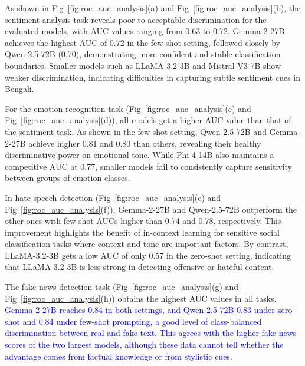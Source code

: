 \documentclass[10pt,letterpaper]{article}
\newcommand{\rev}[1]{\textcolor{blue}{#1}}
\begin{document}
As shown in Fig~\ref{fig:roc_auc_analysis}(a) and Fig~\ref{fig:roc_auc_analysis}(b), the sentiment analysis task reveals poor to acceptable discrimination for the evaluated models, with AUC values ranging from 0.63 to 0.72. Gemma-2-27B achieves the highest AUC of 0.72 in the few-shot setting, followed closely by Qwen-2.5-72B (0.70), demonstrating more confident and stable classification boundaries. Smaller models such as LLaMA-3.2-3B and Mistral-V3-7B show weaker discrimination, indicating difficulties in capturing subtle sentiment cues in Bengali.

For the emotion recognition task (Fig~\ref{fig:roc_auc_analysis}(c) and Fig~\ref{fig:roc_auc_analysis}(d)), all models get a higher AUC value than that of the sentiment task. As shown in the few-shot setting, Qwen-2.5-72B and Gemma-2-27B achieve higher 0.81 and 0.80 than others, revealing their healthy discriminative power on emotional tone. While Phi-4-14B also maintains a competitive AUC at 0.77, smaller models fail to consistently capture sensitivity between groups of emotion classes.

In hate speech detection (Fig~\ref{fig:roc_auc_analysis}(e) and Fig~\ref{fig:roc_auc_analysis}(f)), Gemma-2-27B and Qwen-2.5-72B outperform the other ones with few-shot AUCs higher than 0.74 and 0.78, respectively. This improvement highlights the benefit of in-context learning for sensitive social classification tasks where context and tone are important factors. By contrast, LLaMA-3.2-3B gets a low AUC of only 0.57 in the zero-shot setting, indicating that LLaMA-3.2-3B is less strong in detecting offensive or hateful content.

The fake news detection task (Fig~\ref{fig:roc_auc_analysis}(g) and Fig~\ref{fig:roc_auc_analysis}(h)) obtains the highest AUC values in all tasks. \rev{Gemma-2-27B reaches 0.84 in both settings, and Qwen-2.5-72B 0.83 under zero-shot and 0.84 under few-shot prompting, a good level of class-balanced discrimination between real and fake text. This agrees with the higher fake news scores of the two largest models, although these data cannot tell whether the advantage comes from factual knowledge or from stylistic cues.}
\end{document}
